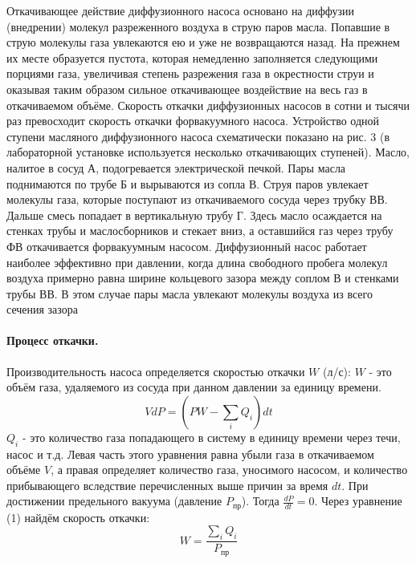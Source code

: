 \documentclass[a4paper,12pt]{article}
\begin{document}
Откачивающее действие диффузионного насоса основано на диффузии (внедрении) молекул разреженного воздуха
в струю паров масла. Попавшие в струю молекулы газа увлекаются ею
и уже не возвращаются назад. На прежнем их месте образуется пустота,
которая немедленно заполняется следующими порциями газа, увеличивая степень разрежения газа в окрестности струи и оказывая таким
образом сильное откачивающее воздействие на весь газ в откачиваемом
объёме. Скорость откачки диффузионных насосов в сотни и тысячи раз
превосходит скорость откачки форвакуумного насоса.
Устройство одной ступени масляного диффузионного насоса схематически показано на рис. 3 (в лабораторной установке используется
несколько откачивающих ступеней). Масло, налитое в сосуд А, подогревается электрической печкой. Пары масла поднимаются по трубе Б
и вырываются из сопла В. Струя паров увлекает молекулы газа, которые поступают из откачиваемого сосуда через трубку ВВ. Дальше смесь
попадает в вертикальную трубу Г. Здесь масло осаждается на стенках
трубы и маслосборников и стекает вниз, а оставшийся газ через трубу
ФВ откачивается форвакуумным насосом. Диффузионный насос работает наиболее эффективно при давлении, когда длина свободного пробега молекул воздуха примерно равна ширине кольцевого зазора между
соплом В и стенками трубы ВВ. В этом случае пары масла увлекают
молекулы воздуха из всего сечения зазора \\ 

\paragraph{Процесс откачки.} 

Производительность насоса определяется скоростью откачки $W$ (л/с): $W$ - это объём газа, удаляемого из сосуда при
данном давлении за единицу времени.
\begin{equation}
    VdP=(PW-\sum\limits_{i} Q_i)dt
\end{equation} 
$Q_i$ - это количество газа попадающего в систему в единицу времени через течи, насос и т.д. Левая часть этого уравнения равна убыли газа в откачиваемом объёме $V$, а правая определяет количество газа, уносимого насосом, и количество прибывающего вследствие перечисленных выше причин за время
$dt$. При достижении предельного вакуума (давление $P_\text{пр}$). Тогда $\frac{dP}{dt}=0$. Через уравнение (1) найдём скорость откачки:
\begin{equation}
    W=\frac{\sum\limits_{i}Q_i}{P_\text{пр}}
\end{equation}
\end{document}
